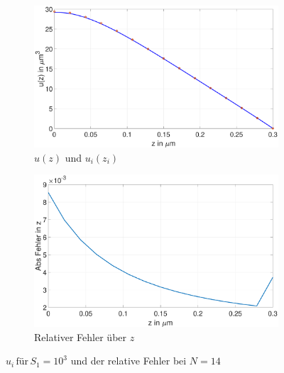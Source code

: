 \begin{figure}[h]
	\begin{subfigure}[b]{0.5\textwidth}
		\includegraphics[width=\textwidth]{figures/station_gl_2_1/S1}
		\caption{$u(z)$ und $u_{i}(z_i)$}
	\end{subfigure}
	\hfill
	\begin{subfigure}[b]{0.5\textwidth}
		\includegraphics[width=1\linewidth]{figures/station_gl_2_1/S1_fehler}
		\caption{Relativer Fehler über $z$}
	\end{subfigure}
	\caption{$u_i \,\text{für} \, S_1=10^3$ und der relative Fehler bei $N=14$ }
\end{figure}
\clearpage
